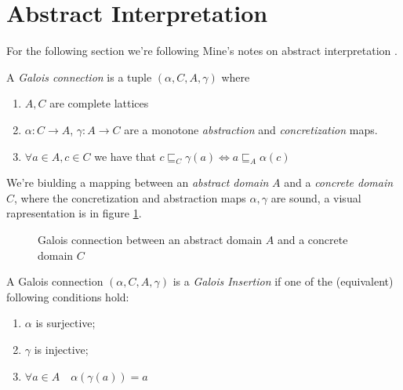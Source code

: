 \section{Abstract Interpretation}

For the following section we're following Mine's notes on abstract
interpretation \cite{mine:course}.

\begin{definition}
  \label{def:galoisconn}
  A \emph{Galois connection} is a tuple \((\alpha, C, A, \gamma)\)
  where
  \begin{enumerate}
  \item \(A,C\) are complete lattices
  \item \(\alpha : C \to A\), \(\gamma : A \to C\) are a monotone
    \emph{abstraction} and \emph{concretization} maps.
  \item \(\forall a \in A, c\in C\) we have that \(c \sqsubseteq_C
    \gamma(a) \iff a \sqsubseteq_A \alpha(c)\)
  \end{enumerate}
\end{definition}

We're biulding a mapping between an \emph{abstract domain} \(A\) and a
\emph{concrete domain} \(C\), where the concretization and abstraction
maps \(\alpha, \gamma\) are sound, a visual rapresentation is in
figure \ref{fig:abstract}.

\begin{figure}
  \centering
  \usetikzlibrary {arrows.meta}
  \caption{Galois connection between an abstract domain \(A\) and a
    concrete domain \(C\)}\label{fig:abstract}
\end{figure}

\begin{definition}
  A Galois connection \((\alpha, C, A, \gamma)\) is a \emph{Galois
  Insertion} if one of the (equivalent) following conditions hold:
  \begin{enumerate}
  \item \(\alpha\) is surjective;
  \item \(\gamma\) is injective;
  \item \(\forall a \in A \quad \alpha(\gamma(a)) = a\)
  \end{enumerate}
\end{definition}

